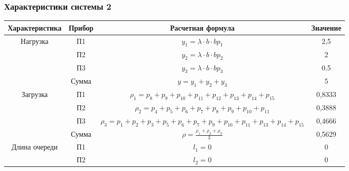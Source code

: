 \subsubsection{Характеристики системы 2}
\begin{adjustbox}{max width=\textwidth}
\begin{tabular}{|c|c|c|c|}
\hline
Характеристика                      & Прибор & Расчетная формула                                                                                        & Значение \\ \hline
\multirow{4}{*}{Нагрузка}           & П1     & $y_1 = \lambda\cdot b\cdot b p_1$                                                                        & 2,5      \\ \cline{2-4}
                                    & П2     & $y_2 = \lambda\cdot b\cdot b p_2$                                                                        & 2        \\ \cline{2-4}
                                    & П3     & $y_3 = \lambda\cdot b\cdot b p_3$                                                                        & 0.5      \\ \cline{2-4}
                                    & Сумма  & $y = y_1 + y_2 + y_3$                                                                                    & 5        \\ \hline
\multirow{4}{*}{Загрузка}           & П1     & $\rho_1 = p_8 + p_9 + p_{10} + p_{11} + p_{12} + p_{13} + p_{14} + p_{15}$                               & 0,8333   \\ \cline{2-4}
                                    & П2     & $\rho_2 = p_4 + p_5 + p_6 + p_7 + p_8 + p_9 + p_{10} + p_{11}$                                           & 0,3888   \\ \cline{2-4}
                                    & П3     & $\rho_3 = p_1 + p_2 + p_3 + p_5 + p_6 + p_7 + p_9 + p_{10} + p_{11} + p_{13} + p_{14} + p_{15}$          & 0,4666   \\ \cline{2-4}
                                    & Сумма  & $\rho = \frac{\rho_1 + \rho_2 + \rho_3}{3}$                                                              & 0,5629   \\ \hline
\multirow{4}{*}{Длина очереди}      & П1     & $l_1 = 0$                                                                                                & 0        \\ \cline{2-4}
                                    & П2     & $l_2 = 0$                                                                                                & 0        \\ \cline{2-4}

\end{tabular}
\end{adjustbox}
